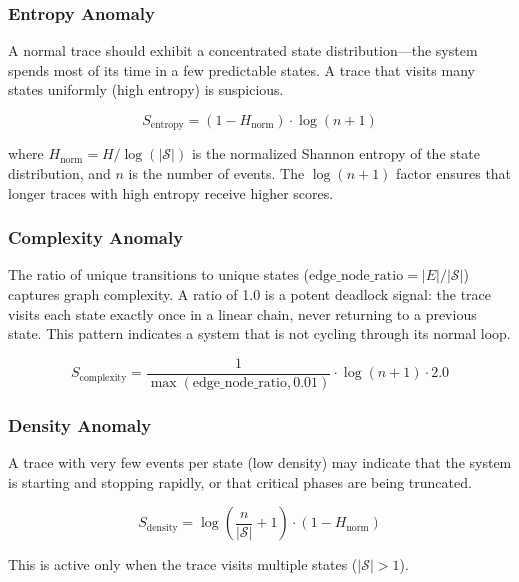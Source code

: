 \documentclass[11pt]{article}
\begin{document}
\subsubsection{Entropy Anomaly}

A normal trace should exhibit a concentrated state distribution---the system spends most of its time in a few predictable states. A trace that visits many states uniformly (high entropy) is suspicious.

\begin{equation}
    S_{\text{entropy}} = (1 - H_{\text{norm}}) \cdot \log(n + 1)
\end{equation}

where $H_{\text{norm}} = H / \log(|\mathcal{S}|)$ is the normalized Shannon entropy of the state distribution, and $n$ is the number of events. The $\log(n+1)$ factor ensures that longer traces with high entropy receive higher scores.

\subsubsection{Complexity Anomaly}

The ratio of unique transitions to unique states ($\text{edge\_node\_ratio} = |E| / |\mathcal{S}|$) captures graph complexity. A ratio of 1.0 is a potent deadlock signal: the trace visits each state exactly once in a linear chain, never returning to a previous state. This pattern indicates a system that is not cycling through its normal loop.

\begin{equation}
    S_{\text{complexity}} = \frac{1}{\max(\text{edge\_node\_ratio}, 0.01)} \cdot \log(n + 1) \cdot 2.0
\end{equation}

\subsubsection{Density Anomaly}

A trace with very few events per state (low density) may indicate that the system is starting and stopping rapidly, or that critical phases are being truncated.

\begin{equation}
    S_{\text{density}} = \log\left(\frac{n}{|\mathcal{S}|} + 1\right) \cdot (1 - H_{\text{norm}})
\end{equation}

This is active only when the trace visits multiple states ($|\mathcal{S}| > 1$).
\end{document}
